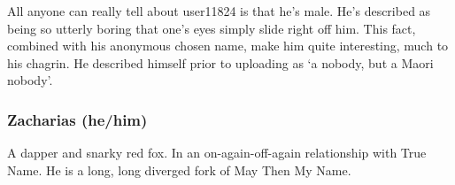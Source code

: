 All anyone can really tell about user11824 is that he's male. He's described as being so utterly boring that one's eyes simply slide right off him. This fact, combined with his anonymous chosen name, make him quite interesting, much to his chagrin. He described himself prior to uploading as `a nobody, but a Maori nobody'.

\begin{comment}
\emph{Appears in:}

\begin{itemize}
\tightlist
\item
  \href{https://toledot.post-self.ink}{\emph{Toledot}}
\item
  \href{https://neviim.post-self.ink}{\emph{Nevi'im}} (mentioned)
\item
  \href{https://mitzvot.post-self.ink}{\emph{Mitzvot}} (mentioned)
\end{itemize}
\end{comment}

\subsubsection{Zacharias (he/him)}

A dapper and snarky red fox. In an on-again-off-again relationship with True Name. He is a long, long diverged fork of May Then My Name.

\begin{comment}
\emph{Appears in:}

\begin{itemize}
\tightlist
\item
  \href{https://neviim.post-self.ink}{\emph{Nevi'im}} (mentioned)
\item
  \href{https://mitzvot.post-self.ink}{\emph{Mitzvot}}
\end{itemize}
\end{comment}
